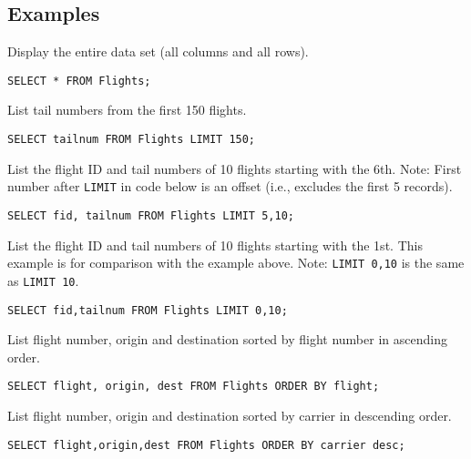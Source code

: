 \documentclass{article}
\begin{document}
 

\subsection*{Examples}
\begin{outline}[enumerate]

\1 Display the entire data set (all columns and all rows). 

\begin{lstlisting}[belowskip=-1.5 \baselineskip]  
SELECT * FROM Flights;
\end{lstlisting} 



\1 List  tail numbers from the first 150 flights.
 
\begin{lstlisting}[belowskip=-1.5 \baselineskip]  
SELECT tailnum FROM Flights LIMIT 150;
\end{lstlisting} 




\1 List the flight ID and tail numbers of 10 flights starting with the 6th.
  Note: First number after \texttt{LIMIT} in code below is an offset (i.e., excludes the  first 5 records).  
\begin{lstlisting}[belowskip=-1.5 \baselineskip]   
SELECT fid, tailnum FROM Flights LIMIT 5,10;
\end{lstlisting} 





\1 List the flight ID and tail numbers of 10 flights starting with the 1st.
  This example is for comparison with the example above.  Note: \texttt{LIMIT 0,10} is the same as \texttt{LIMIT 10}.
   
\begin{lstlisting}[belowskip=-1.5 \baselineskip]   
SELECT fid,tailnum FROM Flights LIMIT 0,10;
\end{lstlisting} 




\1 List flight number, origin and destination sorted by flight number in ascending order.
 
\begin{lstlisting}[belowskip=-1.5 \baselineskip]  
SELECT flight, origin, dest FROM Flights ORDER BY flight;
\end{lstlisting} 







\1  List flight number, origin and destination sorted by carrier in
descending order.
 
\begin{lstlisting}[belowskip=-1.5 \baselineskip]  
SELECT flight,origin,dest FROM Flights ORDER BY carrier desc; 
\end{lstlisting} 





\end{outline}
\end{document}
